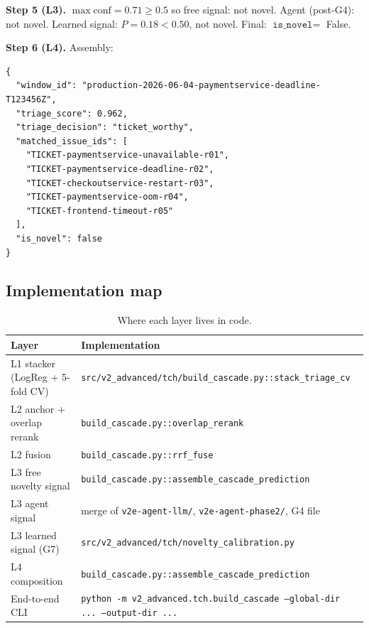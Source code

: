 \textbf{Step 5 (L3).} $\max\mathrm{conf} = 0.71 \geq 0.5$ so free signal: not novel. Agent (post-G4): not novel. Learned signal: $P = 0.18 < 0.50$, not novel. Final: $\texttt{is\_novel} = $ False.

\textbf{Step 6 (L4).} Assembly:

\begin{lstlisting}
{
  "window_id": "production-2026-06-04-paymentservice-deadline-T123456Z",
  "triage_score": 0.962,
  "triage_decision": "ticket_worthy",
  "matched_issue_ids": [
    "TICKET-paymentservice-unavailable-r01",
    "TICKET-paymentservice-deadline-r02",
    "TICKET-checkoutservice-restart-r03",
    "TICKET-paymentservice-oom-r04",
    "TICKET-frontend-timeout-r05"
  ],
  "is_novel": false
}
\end{lstlisting}

\subsection{Implementation map}

\begin{table}[h]
\centering
\caption{Where each layer lives in code.}
\label{tab:code-map}
\small
\begin{tabular}{ll}
\toprule
Layer & Implementation \\
\midrule
L1 stacker (LogReg + 5-fold CV) & \texttt{src/v2\_advanced/tch/build\_cascade.py::stack\_triage\_cv} \\
L2 anchor + overlap rerank & \texttt{build\_cascade.py::overlap\_rerank} \\
L2 \rrf{} fusion & \texttt{build\_cascade.py::rrf\_fuse} \\
L3 free novelty signal & \texttt{build\_cascade.py::assemble\_cascade\_prediction} \\
L3 agent signal & merge of \texttt{v2e-agent-llm/}, \texttt{v2e-agent-phase2/}, G4 file \\
L3 learned signal (G7) & \texttt{src/v2\_advanced/tch/novelty\_calibration.py} \\
L4 composition & \texttt{build\_cascade.py::assemble\_cascade\_prediction} \\
End-to-end CLI & \texttt{python -m v2\_advanced.tch.build\_cascade --global-dir ... --output-dir ...} \\
\bottomrule
\end{tabular}
\end{table}
